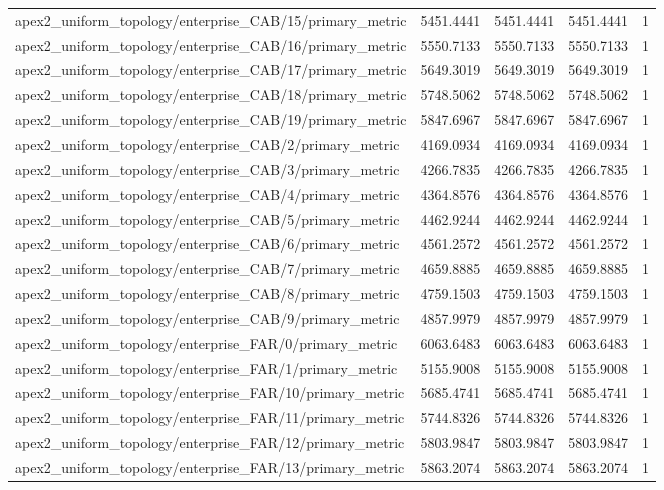 \begin{table}[h]
\begin{tabular}{lrrrr}
apex2_uniform_topology/enterprise_CAB/15/primary_metric & 5451.4441 & 5451.4441 & 5451.4441 & 1 \\
apex2_uniform_topology/enterprise_CAB/16/primary_metric & 5550.7133 & 5550.7133 & 5550.7133 & 1 \\
apex2_uniform_topology/enterprise_CAB/17/primary_metric & 5649.3019 & 5649.3019 & 5649.3019 & 1 \\
apex2_uniform_topology/enterprise_CAB/18/primary_metric & 5748.5062 & 5748.5062 & 5748.5062 & 1 \\
apex2_uniform_topology/enterprise_CAB/19/primary_metric & 5847.6967 & 5847.6967 & 5847.6967 & 1 \\
apex2_uniform_topology/enterprise_CAB/2/primary_metric & 4169.0934 & 4169.0934 & 4169.0934 & 1 \\
apex2_uniform_topology/enterprise_CAB/3/primary_metric & 4266.7835 & 4266.7835 & 4266.7835 & 1 \\
apex2_uniform_topology/enterprise_CAB/4/primary_metric & 4364.8576 & 4364.8576 & 4364.8576 & 1 \\
apex2_uniform_topology/enterprise_CAB/5/primary_metric & 4462.9244 & 4462.9244 & 4462.9244 & 1 \\
apex2_uniform_topology/enterprise_CAB/6/primary_metric & 4561.2572 & 4561.2572 & 4561.2572 & 1 \\
apex2_uniform_topology/enterprise_CAB/7/primary_metric & 4659.8885 & 4659.8885 & 4659.8885 & 1 \\
apex2_uniform_topology/enterprise_CAB/8/primary_metric & 4759.1503 & 4759.1503 & 4759.1503 & 1 \\
apex2_uniform_topology/enterprise_CAB/9/primary_metric & 4857.9979 & 4857.9979 & 4857.9979 & 1 \\
apex2_uniform_topology/enterprise_FAR/0/primary_metric & 6063.6483 & 6063.6483 & 6063.6483 & 1 \\
apex2_uniform_topology/enterprise_FAR/1/primary_metric & 5155.9008 & 5155.9008 & 5155.9008 & 1 \\
apex2_uniform_topology/enterprise_FAR/10/primary_metric & 5685.4741 & 5685.4741 & 5685.4741 & 1 \\
apex2_uniform_topology/enterprise_FAR/11/primary_metric & 5744.8326 & 5744.8326 & 5744.8326 & 1 \\
apex2_uniform_topology/enterprise_FAR/12/primary_metric & 5803.9847 & 5803.9847 & 5803.9847 & 1 \\
apex2_uniform_topology/enterprise_FAR/13/primary_metric & 5863.2074 & 5863.2074 & 5863.2074 & 1 \\

\end{tabular}
\end{table}
